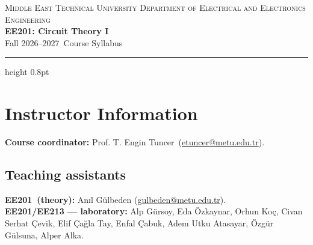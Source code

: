 \documentclass[10pt,a4paper]{article}
\makeatletter
\newcommand{\coursecode}{EE201}
\newcommand{\coursename}{Circuit Theory I}
\newcommand{\term}{Fall 2026--2027}
\newcommand{\myname}{Mert Ankaralı}
\newcommand{\myoffice}{A-410/D-104}
\newcommand{\mymail}{mertan@metu.edu.tr}
\newcommand{\coordinator}{Prof. T. Engin Tuncer}
\newcommand{\coordinatormail}{etuncer@metu.edu.tr}
\makeatother
\begin{document}
\begin{center}
  {\small\scshape Middle East Technical University \quad\textbar\quad
   Department of Electrical and Electronics Engineering}\\[3pt]
  {\Large\bfseries\color{metured} \coursecode: \coursename}\\[2pt]
  {\small \term\ \quad\textbar\quad Course Syllabus}
\end{center}
\vspace{-0.3em}
{\color{metured}\hrule height 0.8pt}
\vspace{0.4em}

\section{Instructor Information}

\begin{center}
\small
{\setlength{\tabcolsep}{4pt}}
\end{center}
\vspace{-0.4em}

\textbf{Course coordinator:} \coordinator\
(\href{mailto:\coordinatormail}{\coordinatormail}).

\subsection*{Teaching assistants}
\textbf{\coursecode\ (theory):} Anıl Gülbeden (\href{mailto:gulbeden@metu.edu.tr}{gulbeden@metu.edu.tr}).\\
\textbf{\coursecode/EE213 --- laboratory:} Alp Gürsoy, Eda Özkaynar, Orhun Koç, Civan Serhat Çevik,
Elif Çağla Tay, Enfal Çabuk, Adem Utku Atasayar, Özgür Gülsuna, Alper Alka.
\end{document}

